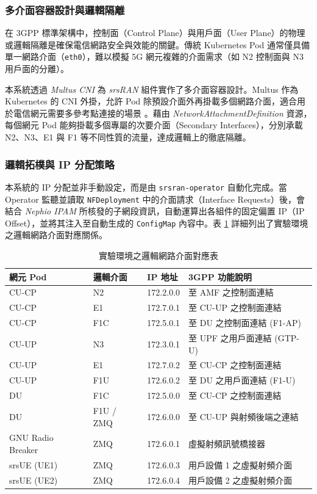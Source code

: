 \subsubsection{多介面容器設計與邏輯隔離}
在 3GPP 標準架構中，控制面（Control Plane）與用戶面（User Plane）的物理或邏輯隔離是確保電信網路安全與效能的關鍵。傳統 Kubernetes Pod 通常僅具備單一網路介面（\texttt{eth0}），難以模擬 5G 網元複雜的介面需求（如 N2 控制面與 N3 用戶面的分離）。

本系統透過 \textit{Multus CNI} 為 \textit{srsRAN} 組件實作了多介面容器設計。Multus 作為 Kubernetes 的 CNI 外掛，允許 Pod 除預設介面外再掛載多個網路介面，適合用於電信網元需要多參考點連接的場景 \cite{multus_cni}。藉由 \textit{NetworkAttachmentDefinition} 資源，每個網元 Pod 能夠掛載多個專屬的次要介面（Secondary Interfaces），分別承載 N2、N3、E1 與 F1 等不同性質的流量，達成邏輯上的徹底隔離。

\subsubsection{邏輯拓樸與 IP 分配策略}
本系統的 IP 分配並非手動設定，而是由 \texttt{srsran-operator} 自動化完成。當 Operator 監聽並讀取 \texttt{NFDeployment} 中的介面請求（Interface Requests）後，會結合 \textit{Nephio IPAM} 所核發的子網段資訊，自動運算出各組件的固定偏置 IP（IP Offset），並將其注入至自動生成的 \texttt{ConfigMap} 內容中。表 \ref{tab:logical_interface_mapping} 詳細列出了實驗環境之邏輯網路介面對應關係。

\begin{table}[htbp]
    \centering
    \caption{實驗環境之邏輯網路介面對應表}
    \label{tab:logical_interface_mapping}
    \begin{tabular}{|l|l|l|l|}
    \hline
    \textbf{網元 Pod} & \textbf{邏輯介面} & \textbf{IP 地址} & \textbf{3GPP 功能說明} \\ \hline
    CU-CP & N2 & 172.2.0.0 & 至 AMF 之控制面連結 \\ \hline
    CU-CP & E1 & 172.7.0.1 & 至 CU-UP 之控制面連結 \\ \hline
    CU-CP & F1C & 172.5.0.1 & 至 DU 之控制面連結 (F1-AP) \\ \hline
    CU-UP & N3 & 172.3.0.1 & 至 UPF 之用戶面連結 (GTP-U) \\ \hline
    CU-UP & E1 & 172.7.0.2 & 至 CU-CP 之控制面連結 \\ \hline
    CU-UP & F1U & 172.6.0.2 & 至 DU 之用戶面連結 (F1-U) \\ \hline
    DU & F1C & 172.5.0.0 & 至 CU-CP 之控制面連結 \\ \hline
    DU & F1U / ZMQ & 172.6.0.0 & 至 CU-UP 與射頻後端之連結 \\ \hline
    GNU Radio Breaker & ZMQ & 172.6.0.1 & 虛擬射頻訊號橋接器 \\ \hline
    srsUE (UE1) & ZMQ & 172.6.0.3 & 用戶設備 1 之虛擬射頻介面 \\ \hline
    srsUE (UE2) & ZMQ & 172.6.0.4 & 用戶設備 2 之虛擬射頻介面 \\ \hline
    \end{tabular}
\end{table}

